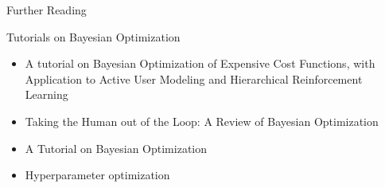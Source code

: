 \begin{frame}[c]{Further Reading}

Tutorials on Bayesian Optimization
\begin{itemize}
    \item A tutorial on Bayesian Optimization of Expensive Cost Functions, with Application to Active User Modeling and Hierarchical Reinforcement Learning 
    \item Taking the Human out of the Loop: A Review of Bayesian Optimization 
    \item A Tutorial on Bayesian Optimization 
    \item Hyperparameter optimization
\end{itemize}

\end{frame}

